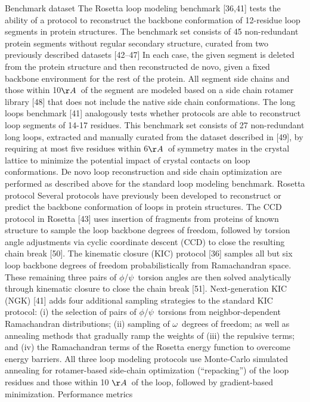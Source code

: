 Benchmark dataset
The Rosetta loop modeling benchmark [36,41] tests the ability of a protocol to reconstruct the backbone conformation of 12-residue loop segments in protein structures. The benchmark set consists of 45 non-redundant protein segments without regular secondary structure, curated from two previously described datasets [42–47]
 In each case, the given segment is deleted from the protein structure and then reconstructed de novo, given a fixed backbone environment for the rest of the protein. All segment side chains and those within 10$\AA$\ of the segment are modeled based on a side chain rotamer library [48] that does not include the native side chain conformations.
The long loops benchmark [41] analogously tests whether protocols are able to reconstruct loop segments of 14-17 residues. This benchmark set consists of 27 non-redundant long loops, extracted and manually curated from the dataset described in [49], by requiring at most five residues within 6$\AA$\ of symmetry mates in the crystal lattice to minimize the potential impact of crystal contacts on loop conformations. De novo loop reconstruction and side chain optimization are performed as described above for the standard loop modeling benchmark.
Rosetta protocol
Several protocols have previously been developed to reconstruct or predict the backbone conformation of loops in protein structures. The CCD protocol in Rosetta [43] uses insertion of fragments from proteins of known structure to sample the loop backbone degrees of freedom, followed by torsion angle adjustments via cyclic coordinate descent (CCD) to close the resulting chain break [50]. The kinematic closure (KIC) protocol [36] samples all but six loop backbone degrees of freedom probabilistically from Ramachandran space. These remaining three pairs of $\phi$/$\psi$\ torsion angles are then solved analytically through kinematic closure to close the chain break [51]. Next-generation KIC (NGK) [41] adds four additional sampling strategies to the standard KIC protocol: (i) the selection of pairs of $\phi$/$\psi$\ torsions from neighbor-dependent Ramachandran distributions; (ii) sampling of $\omega$\ degrees of freedom; as well as annealing methods that gradually ramp the weights of (iii) the repulsive terms; and (iv) the Ramachandran terms of the Rosetta energy function to overcome energy barriers. All three loop modeling protocols use Monte-Carlo simulated annealing for rotamer-based side-chain optimization (“repacking”) of the loop residues and those within 10 $\AA$\ of the loop, followed by gradient-based minimization.
Performance metrics
